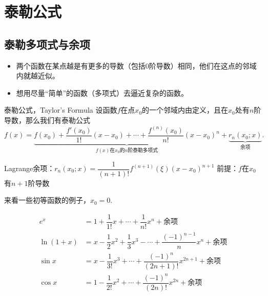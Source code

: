 
\section{泰勒公式}


\subsection{泰勒多项式与余项}


\begin{frame}

\begin{itemize}
\item<1-> 两个函数在某点越是有更多的导数（包括$0$阶导数）相同，他们在这点的邻域内就越近似。
\item<2-> 想用尽量``简单''的函数（多项式）去逼近复杂的函数。
\end{itemize}

\pause

\begin{block}{泰勒公式，Taylor's Formula}
设函数$f$在点$x_0$的一个邻域内由定义，且在$x_0$处有$n$阶导数，那么我们有泰勒公式
{\small
\[f(x) = \underbrace{f(x_0) + \dfrac{f'(x_0)}{1!}(x-x_0) + \cdots + \dfrac{f^{(n)}(x_0)}{n!}(x-x_0)^n}_{\text{$f(x)$在$x_0$的$n$阶泰勒多项式}} + \underbrace{r_n(x_0;x)}_{\text{余项}}.\]
}
\end{block}

\pause

Lagrange余项：\quad $r_n(x_0;x) = \dfrac{1}{(n+1)!}f^{(n+1)}(\xi)(x-x_0)^{n+1}$\newline
前提：$f$在$x_0$有$n+1$阶导数

\end{frame}


\begin{frame}

来看一些初等函数的例子，$x_0=0.$

\pause

\begin{align*}
e^x & = 1 + \dfrac{1}{1!}x + \cdots + \dfrac{1}{n!}x^n + \text{余项} \\
\ln(1+x) & = x - \dfrac{1}{2}x^2 + \dfrac{1}{3}x^3 - \cdots + \dfrac{(-1)^{n-1}}{n}x^n + \text{余项} \\
\sin x & = x - \dfrac{1}{3!}x^3 + \cdots + \dfrac{(-1)^n}{(2n+1)!}x^{2n+1} + \text{余项} \\
\cos x & = 1 - \dfrac{1}{2!}x^2 + \cdots + \dfrac{(-1)^n}{(2n)!}x^{2n} + \text{余项} \\
\end{align*}

\end{frame}

